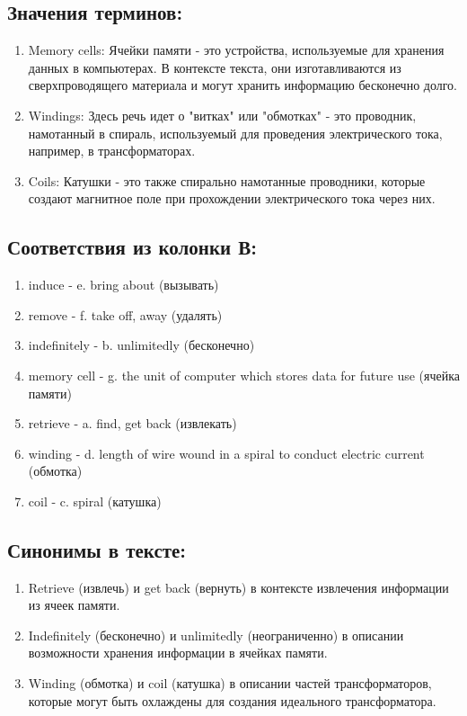 \subsection*{Значения терминов:}
\begin{enumerate}
      \item Memory cells: Ячейки памяти - это устройства, используемые для хранения данных в компьютерах. В контексте текста, они изготавливаются из сверхпроводящего материала и могут хранить информацию бесконечно долго.
      \item Windings: Здесь речь идет о "витках" или "обмотках" - это проводник, намотанный в спираль, используемый для проведения электрического тока, например, в трансформаторах.
      \item Coils: Катушки - это также спирально намотанные проводники, которые создают магнитное поле при прохождении электрического тока через них.
\end{enumerate}

\subsection*{Соответствия из колонки В:}
\begin{enumerate}
      \item induce - e. bring about (вызывать)
      \item remove - f. take off, away (удалять)
      \item indefinitely - b. unlimitedly (бесконечно)
      \item memory cell - g. the unit of computer which stores data for future use (ячейка памяти)
      \item retrieve - a. find, get back (извлекать)
      \item winding - d. length of wire wound in a spiral to conduct electric current (обмотка)
      \item coil - c. spiral (катушка)
\end{enumerate}

\subsection*{Синонимы в тексте:}
\begin{enumerate}
      \item Retrieve (извлечь) и get back (вернуть) в контексте извлечения информации из ячеек памяти.
      \item Indefinitely (бесконечно) и unlimitedly (неограниченно) в описании возможности хранения информации в ячейках памяти.
      \item Winding (обмотка) и coil (катушка) в описании частей трансформаторов, которые могут быть охлаждены для создания идеального трансформатора.
\end{enumerate}

